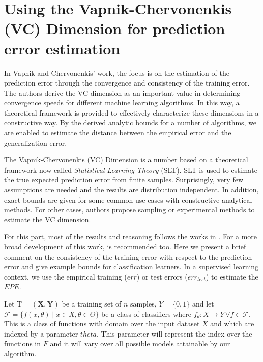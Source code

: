 \section{ Using the Vapnik-Chervonenkis (VC) Dimension for prediction error estimation}\label{section-VcDimension}


In Vapnik and Chervonenkis' work, the focus is on the estimation of the prediction error through the convergence and consistency of the training error. The authors derive the VC dimension as an important value in determining convergence speeds for different machine learning algorithms. In this way, a theoretical framework is provided to effectively characterize these dimensions in a constructive way. By the derived analytic bounds for a number of algorithms, we are enabled to estimate the distance between the empirical error and the generalization error.

The Vapnik-Chervonenkis (VC) Dimension is a number based on a theoretical framework now called \textit{Statistical Learning Theory} (SLT). SLT is used to estimate the true expected prediction error from finite samples. Surprisingly, very few assumptions are needed and the results are distribution independent. In addition, exact bounds are given for some common use cases with constructive analytical methods. For other cases, authors propose sampling or experimental methods to estimate the VC dimension.

For this part, most of the results and reasoning follows the works in \textcite{cherkassky-learning2007}. For a more broad development of this work, \textcite{vapnik-nature2013} is recommended too. Here we present a brief comment on the consistency of the training error with respect to the prediction error and give example bounds for classification learners. In a supervised learning context, we use the empirical training ($\overline{err}$) or test errors ($\overline{err}_{test}$) to estimate the $EPE$.

Let $\mathrm{T} = (\textbf{X},\textbf{Y})$ be a training set of $n$ samples, $Y = \{0,1 \}$ and let $\mathcal {F} = \big \{ f(x,\theta) \mid x \in X, \theta \in \Theta \big \}$ be a class of classifiers where $f_\theta: X \rightarrow Y \, \forall f \in \mathcal {F}$. This is a class of functions with domain over the input dataset $X$ and which are indexed by a parameter $theta$. This parameter will represent the index over the functions in $F$ and it will vary over all possible models attainable by our algorithm.

